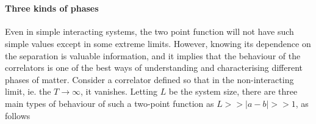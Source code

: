 \documentclass{homework}
\begin{document}




\blanky \\

\paragraph{\textbf{Three kinds of phases}}

Even in simple interacting systems, the two point function will not have such simple values except in some extreme limits. However, knowing its dependence on the separation is valuable information, and it implies that the behaviour of the correlators is one of the best ways of understanding and characterising different phases of matter. Consider a correlator defined so that in the non-interacting limit, ie. the $T \rightarrow \infty$, it vanishes. Letting $L$ be the system size, there are three main types of behaviour of such a two-point function as $L >> |a-b|>> 1$, as follows 
\end{document}
